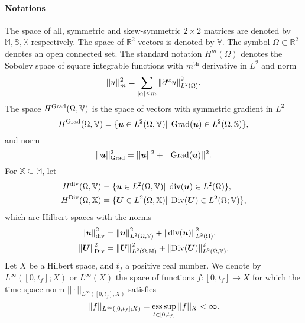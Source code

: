 \paragraph{Notations}
The space of all, symmetric and skew-symmetric $2\times 2$ matrices are denoted by $\mathbb{M}, \mathbb{S}, \mathbb{K}$ respectively. The space of $\mathbb{R}^2$ vectors is denoted by $\mathbb{V}$. The symbol $\Omega \subset \mathbb{R}^2$ denotes an open connected set. The standard notation $H^m(\Omega)$ denotes the Sobolev space of square integrable functions with  $m^\text{th}$ derivative in $L^2$ and norm 
\begin{equation*}
||u||_m^2 = {\sum_{|\alpha|\le m} \left\|\partial^\alpha u\right\|_{L^2(\Omega)}^2}.
\end{equation*}
The space $H^{\operatorname*{Grad}}(\Omega, \mathbb{V})$ is the space of vectors with symmetric gradient in $L^2$
\begin{equation*}
	H^{\operatorname*{Grad}}(\Omega, \mathbb{V}) = \{\bm{u} \in L^2(\Omega, \mathbb{V}) \vert \; \operatorname*{Grad}(\bm{u}) \in L^2(\Omega, \mathbb{S}) \},
\end{equation*}
and norm 
\begin{equation*}
||\bm{u}||_{\operatorname*{Grad}}^2 = {||\bm{u}||^2 + ||\operatorname*{Grad}(\bm{u})||^2}.
\end{equation*}
For $\mathbb{X} \subseteq \mathbb{M}$, let
\begin{equation*}
\begin{aligned}
H^{\operatorname{div}}(\Omega, \mathbb{V}) &= \{\bm{u} \in L^2(\Omega, \mathbb{V}) \vert \; \operatorname{div}(\bm{u}) \in L^2(\Omega) \}, \\
H^{\operatorname*{Div}}(\Omega, \mathbb{X}) &= \{\bm{U} \in L^2(\Omega, \mathbb{X}) \vert \; \operatorname*{Div}(\bm{U}) \in L^2(\Omega; \mathbb{V}) \},
\end{aligned}
\end{equation*}
which are Hilbert spaces with the norms 
\begin{align*}
\left\|\bm{u}\right\|_{\operatorname{div}}^2 &= {\left\|\bm{u}\right\|_{L^2(\Omega, \mathbb{V})}^2 + \left\|\operatorname{div}(\bm{u})\right\|_{L^2(\Omega)}^2}, \\
\left\|\bm{U}\right\|_{\operatorname*{Div}}^2 &= {\left\|\bm{U}\right\|_{L^2(\Omega, \mathbb{M})}^2 + \left\|\operatorname*{Div}(\bm{U})\right\|_{L^2(\Omega, \mathbb{V})}^2}.
\end{align*}
Let ${X}$ be a Hilbert space, and $t_f$ a positive real number. We denote by $L^\infty([0, t_f]; {X})$ or $L^\infty({X})$ the space of functions $f: [0, t_f] \rightarrow X$ for which the time-space norm $||\cdot||_{L^\infty([0, t_f]; {X})}$ satisfies
\[
||f||_{L^\infty([0, t_f]; {X})} = \operatorname*{ess\,sup}_{t \in [0,t_f]} ||f||_{{X}} < \infty.
\]

